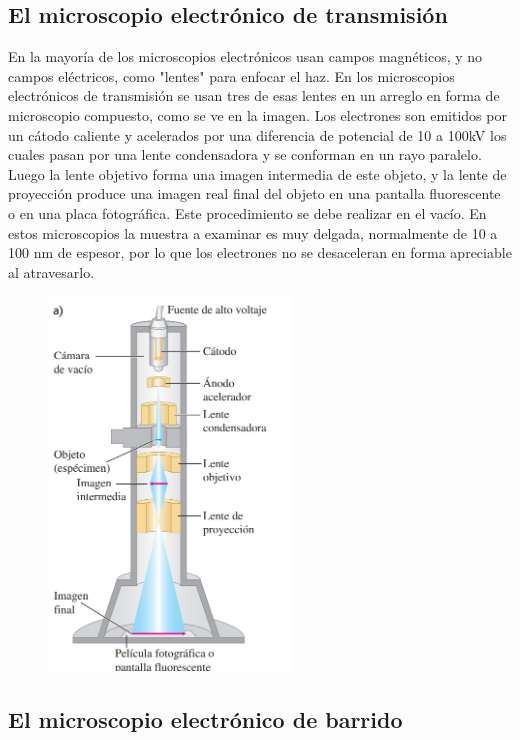 \documentclass[a4paper]{article}
\begin{document}
    \subsection{El microscopio electrónico de transmisión}

    \indent En la mayoría de los microscopios electrónicos usan campos magnéticos, y no campos eléctricos, como "lentes" para enfocar el haz. En los microscopios electrónicos de transmisión se usan tres de esas lentes en un arreglo en forma de microscopio compuesto, como se ve en la imagen. Los electrones son emitidos por un cátodo caliente y acelerados por una diferencia de potencial de 10 a 100kV los cuales pasan por una lente condensadora y se conforman en un rayo paralelo. Luego la lente objetivo forma una imagen intermedia de este objeto, y la lente de proyección produce una imagen real final del objeto en una pantalla fluorescente o en una placa fotográfica. Este procedimiento se debe realizar en el vacío. En estos microscopios la muestra a examinar es muy delgada, normalmente de 10 a 100 nm de espesor, por lo que los electrones no se desaceleran en forma apreciable al atravesarlo.\\

    \begin{figure}[h!]
        \centering
        \includegraphics[width = 6.5cm]{../microscopio.png}
    \end{figure}
\subsection{El microscopio electrónico de barrido}
\end{document}
